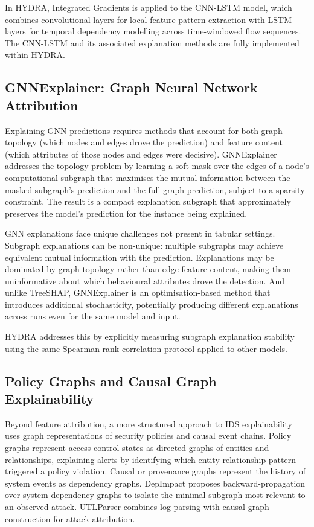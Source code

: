 \documentclass[12pt,a4paper]{report}
\begin{document}
In HYDRA, Integrated Gradients is applied to the CNN-LSTM model, which combines convolutional layers for local feature pattern extraction with LSTM layers for temporal dependency modelling across time-windowed flow sequences. The CNN-LSTM and its associated explanation methods are fully implemented within HYDRA.

\subsection{GNNExplainer: Graph Neural Network Attribution}
\label{sec:gnnexplainer}

Explaining GNN predictions requires methods that account for both graph topology (which nodes and edges drove the prediction) and feature content (which attributes of those nodes and edges were decisive). GNNExplainer \citep{ying2019} addresses the topology problem by learning a soft mask over the edges of a node's computational subgraph that maximises the mutual information between the masked subgraph's prediction and the full-graph prediction, subject to a sparsity constraint. The result is a compact explanation subgraph that approximately preserves the model's prediction for the instance being explained.

GNN explanations face unique challenges not present in tabular settings. Subgraph explanations can be non-unique: multiple subgraphs may achieve equivalent mutual information with the prediction. Explanations may be dominated by graph topology rather than edge-feature content, making them uninformative about which behavioural attributes drove the detection. And unlike TreeSHAP, GNNExplainer is an optimisation-based method that introduces additional stochasticity, potentially producing different explanations across runs even for the same model and input.

HYDRA addresses this by explicitly measuring subgraph explanation stability using the same Spearman rank correlation protocol applied to other models.

\subsection{Policy Graphs and Causal Graph Explainability}
\label{sec:policy-graphs}

Beyond feature attribution, a more structured approach to IDS explainability uses graph representations of security policies and causal event chains. Policy graphs \citep{alves2017} represent access control states as directed graphs of entities and relationships, explaining alerts by identifying which entity-relationship pattern triggered a policy violation. Causal or provenance graphs represent the history of system events as dependency graphs. DepImpact \citep{fang2022} proposes backward-propagation over system dependency graphs to isolate the minimal subgraph most relevant to an observed attack. UTLParser \citep{tan2024} combines log parsing with causal graph construction for attack attribution.
\end{document}
